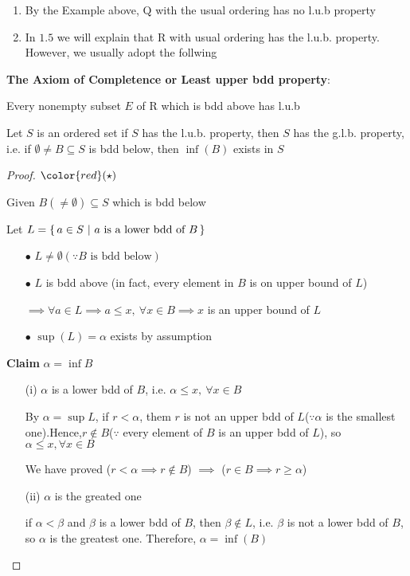 \begin{rmk*}$ $
	\begin{enumerate}
		\item By the Example above, $\mathrm{Q}$ with the usual ordering has no l.u.b property
		\item In $1.5$ we will explain that $\mathrm{R}$ with usual ordering has the l.u.b. property.
		However, we usually adopt the follwing
	\end{enumerate}
\end{rmk*}



\textbf{The Axiom of Completence or Least upper bdd property}:

Every nonempty subset $E$ of $\mathrm{R}$ which is bdd above has l.u.b

\begin{thm*}[l.u.b.p. $\rightarrow$ g.l.b.p.]
	Let $S$ is an ordered set if $S$ has the l.u.b. property, then $S$ has the g.l.b. property, i.e. if $\emptyset \neq B \subseteq S$ is bdd below, then $\inf (B)$ exists in $S$ 
\end{thm*}

\begin{proof}$\color{red}(\star)$

	Given $B(\neq \emptyset) \subseteq S$ which is bdd below
	
	Let $L = \left\{ \,a \in S ~|~ a \text{ is a lower bdd of }B \,\right\}$
	
	\begin{enumerate}
		\item[$\bullet$] $L \neq \emptyset(\because B\text{ is bdd below})$
		\item[$\bullet$] $L$ is bdd above (in fact, every element in $B$ is on upper bound of $L$)
		
		$\implies \forall a \in L \implies a \leq x ,~\forall x \in B \implies x$ is an upper bound of $L$ 
		\item[$\bullet$] $\sup (L) = \alpha$ exists by assumption
		
	\end{enumerate}
	
	\textbf{Claim} $\alpha = \inf B$
	
	\begin{enumerate}
		\item[(i)] $\alpha$ is a lower bdd of $B$, i.e. $\alpha \leq x,~\forall x \in B$
		
		By $\alpha = \sup L$, if $r < \alpha$, them $r$ is not an upper bdd of $L$($\because \alpha$ is the smallest one).Hence,$r \notin B$($\because$ every element of $B$ is an upper bdd of $L$), so $\alpha \leq x, \forall x \in B$ 
		
		We have proved ($r<\alpha \implies r \notin B$) $\implies$ ($r\in B \implies r \geq \alpha$)
		\item[(ii)] $\alpha$ is the greated one
		
		if $\alpha < \beta$ and $\beta$ is a lower bdd of $B$, then $\beta \notin L$, i.e. $\beta$ is not a lower bdd of $B$, so $\alpha$ is the greatest one. Therefore, $\alpha = \inf (B)$
	\end{enumerate}
	
\end{proof}

